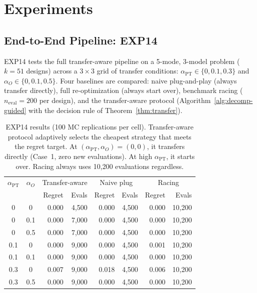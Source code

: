 
\section{Experiments}
\label{sec:experiments}

\subsection{End-to-End Pipeline: EXP14}
\label{sec:exp14}

EXP14 tests the full transfer-aware pipeline on a 5-mode, 3-model
problem ($k{=}51$ designs) across a $3 \times 3$ grid of transfer
conditions: $\alpha_{\mathrm{PT}} \in \{0, 0.1, 0.3\}$ and
$\alpha_O \in \{0, 0.1, 0.5\}$.  Four baselines are compared:
naive plug-and-play (always transfer directly), full re-optimization
(always start over), benchmark racing ($n_{\mathrm{eval}}{=}200$ per
design), and the transfer-aware protocol (Algorithm~\ref{alg:decomp-guided}
with the decision rule of Theorem~\ref{thm:transfer}).

\begin{table}[t]
\centering
\caption{EXP14 results (100 MC replications per cell). Transfer-aware
  protocol adaptively selects the cheapest strategy that meets the
  regret target. At $(\alpha_{\mathrm{PT}}, \alpha_O) = (0, 0)$, it
  transfers directly (Case~1, zero new evaluations). At high
  $\alpha_{\mathrm{PT}}$, it starts over. Racing always uses
  10,200 evaluations regardless.}
\label{tab:exp14}
\small
\begin{tabular}{@{}cc|rr|rr|rr@{}}
\toprule
$\alpha_{\mathrm{PT}}$ & $\alpha_O$ &
  \multicolumn{2}{c|}{Transfer-aware} &
  \multicolumn{2}{c|}{Naive plug} &
  \multicolumn{2}{c}{Racing} \\
& & Regret & Evals & Regret & Evals & Regret & Evals \\
\midrule
0   & 0   & 0.000 & 4,500  & 0.000 & 4,500  & 0.000 & 10,200 \\
0   & 0.1 & 0.000 & 7,000  & 0.000 & 4,500  & 0.000 & 10,200 \\
0   & 0.5 & 0.000 & 7,000  & 0.000 & 4,500  & 0.000 & 10,200 \\
0.1 & 0   & 0.000 & 9,000  & 0.000 & 4,500  & 0.001 & 10,200 \\
0.1 & 0.1 & 0.000 & 9,000  & 0.000 & 4,500  & 0.000 & 10,200 \\
0.3 & 0   & 0.007 & 9,000  & 0.018 & 4,500  & 0.006 & 10,200 \\
0.3 & 0.5 & 0.000 & 9,000  & 0.000 & 4,500  & 0.000 & 10,200 \\
\bottomrule
\end{tabular}
\end{table}

